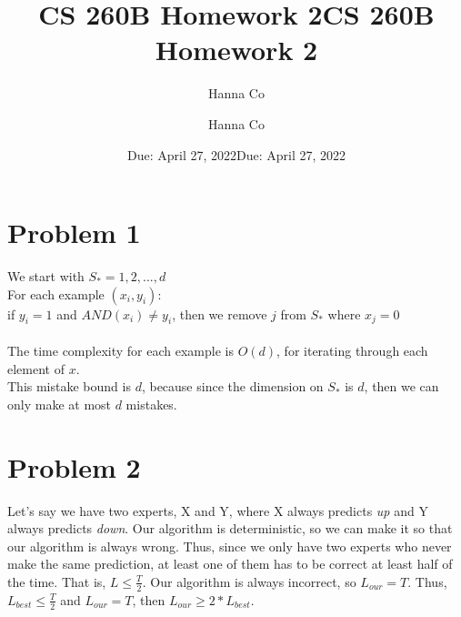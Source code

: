 \documentclass[12pt, letterpaper]{article}
\title{CS 260B Homework 2}
\author{Hanna Co}
\affil{Collaborators: Isha Gonugunta}
\date{Due: April 27, 2022}
\title{CS 260B Homework 2}
\author{Hanna Co}
\date{Due: April 27, 2022}
\newcommand\tab[1][1cm]{\hspace*{#1}}
\begin{document}
\maketitle
\newpage
\section{Problem 1}
We start with $S_*={1,2,...,d}$\\
For each example $(x_i,y_i)$:\\
\tab if $y_i = 1$ and $AND(x_i) \neq y_i$, then we remove $j$ from $S_*$ where $x_j=0$\\
\\
The time complexity for each example is $O(d)$, for iterating through each element of $x$. \\
This mistake bound is $d$, because since the dimension on $S_*$ is $d$, then we can only make at most $d$ mistakes.

\newpage
\section{Problem 2}
Let's say we have two experts, X and Y, where X always predicts {\it{up}} and Y always predicts {\it{down}}. Our algorithm is deterministic, so we can make it so that our algorithm is always wrong. Thus, since we only have two experts who never make the same prediction, at least one of them has to be correct at least half of the time. That is, $L \leq \frac{T}{2}$. Our algorithm is always incorrect, so $L_{our}=T$. Thus, $L_{best}\leq\frac{T}{2}$ and $L_{our}=T$, then $L_{our}\geq2*L_{best}$.

\newpage
\end{document}
